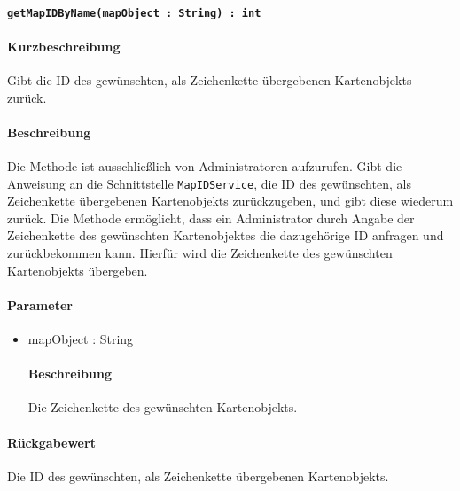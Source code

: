 \paragraph{\texttt{getMapIDByName(mapObject : String) : int}}%
\paragraph*{Kurzbeschreibung}
Gibt die ID des gewünschten, als Zeichenkette übergebenen Kartenobjekts zurück.
\paragraph*{Beschreibung}
Die Methode ist ausschließlich von Administratoren aufzurufen.
Gibt die Anweisung an die Schnittstelle \texttt{MapIDService}, die ID des gewünschten, als Zeichenkette übergebenen Kartenobjekts zurückzugeben, und gibt diese wiederum zurück.
Die Methode ermöglicht, dass ein Administrator durch Angabe der Zeichenkette des gewünschten Kartenobjektes die dazugehörige ID anfragen und zurückbekommen kann.
Hierfür wird die Zeichenkette des gewünschten Kartenobjekts übergeben.
\paragraph*{Parameter}
\begin{itemize}
	\item mapObject : String
		\paragraph*{Beschreibung}
		Die Zeichenkette des gewünschten Kartenobjekts.
\end{itemize}
\paragraph*{Rückgabewert}
Die ID des gewünschten, als Zeichenkette übergebenen Kartenobjekts.
